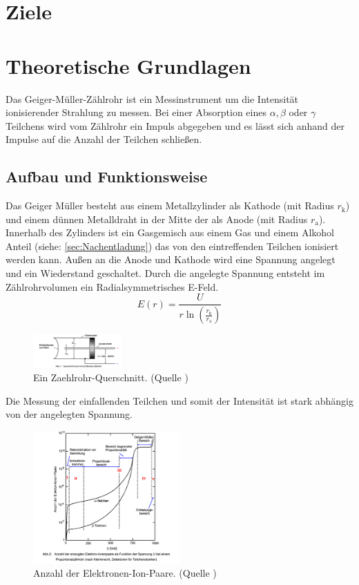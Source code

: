 \section{Ziele}
\label{sec:Ziele}
\section{Theoretische Grundlagen}
\label{sec:Theorie}
Das Geiger-Müller-Zählrohr ist ein Messinstrument um die Intensität ionisierender Strahlung zu messen.
Bei einer Absorption eines $\alpha , \beta$ oder $\gamma$ Teilchens wird vom Zählrohr ein Impuls abgegeben und es lässt sich anhand der Impulse auf die Anzahl der Teilchen schließen.
\subsection{Aufbau und Funktionsweise}
Das Geiger Müller besteht aus einem Metallzylinder als Kathode (mit Radius $r_{\text{k}}$) und einem dünnen Metalldraht in der Mitte der als Anode (mit Radius $r_{\text{a}}$).
Innerhalb des Zylinders ist ein Gasgemisch aus einem Gas und einem Alkohol Anteil (siehe: \ref{sec:Nachentladung}) das von den eintreffenden Teilchen ionisiert werden kann.
Außen an die Anode und Kathode wird eine Spannung angelegt und ein Wiederstand geschaltet.
Durch die angelegte Spannung entsteht im Zählrohrvolumen ein Radialsymmetrisches E-Feld.
\begin{equation}
    E(r) = \frac{U}{r \ln\left(\frac{r_{\text{k}}}{r_{\text{a}}}\right)}
\end{equation}
\begin{figure}
    \centering
    \includegraphics[width=0.3\textwidth]{bilder/Zaehlrohr_Querschnitt.png}
    \caption{Ein Zaehlrohr-Querschnitt. (Quelle \cite{Anleitung})}
    \label{fig:Zaehlrohr}
\end{figure}
Die Messung der einfallenden Teilchen und somit der Intensität ist stark abhängig von der angelegten Spannung.
\begin{figure}
    \centering
    \includegraphics[width=0.5\textwidth]{bilder/Anzahl_der_Elektronen.png}
    \caption{ Anzahl der Elektronen-Ion-Paare. (Quelle \cite{Anleitung})}
    \label{fig:Anzahl_der_Elektronen}
\end{figure}
